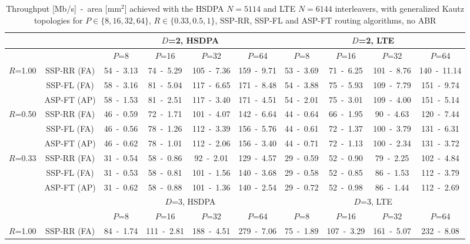 \documentclass[10pt,twocolumn,journal]{IEEEtran}
\begin{document}
\begin{table*}[t!]
  \centering
  \caption{Throughput [Mb/s]~-~area [mm$^2$] achieved with the HSDPA $N=5114$ and LTE $N=6144$ interleavers, 
with generalized Kautz topologies for $P \in \{8, 16, 32, 64\}$, $R \in \{0.33, 0.5, 1\}$, SSP-RR, SSP-FL and ASP-FT routing algorithms, no ABR} 
  \label{tab:hsdpa_lte}
   { \scriptsize
  \begin{tabular}{|c|c|c|c|c|c|c|c|c|c|}
\hline
& 	 & \multicolumn{4}{c|}{$D$=2, HSDPA} & \multicolumn{4}{c|}{$D$=2, LTE} \\
\hline
& 	 & $P$=8 & $P$=16 & $P$=32 & $P$=64  & $P$=8 & $P$=16 & $P$=32 & $P$=64 \\
\hline
\multirow{3}{*}{$R$=1.00} & SSP-RR (FA) & 54~-~3.13 & 74~-~5.29 & 105~-~7.36 & 159~-~9.71 
& 53~-~3.69 & 71~-~6.25 & 101~-~8.76 & 140~-~11.14 \\
& SSP-FL (FA) & 58~-~3.16 & 81~-~5.04 & 117~-~6.65 & 171~-~8.48 
& 54~-~3.88 & 75~-~5.93 & 109~-~7.79 & 151~-~9.74 \\
& ASP-FT (AP) & 58~-~1.53 & 81~-~2.51 & 117~-~3.40 & 171~-~4.51 
& 54~-~2.01 & 75~-~3.01 & 109~-~4.00 & 151~-~5.14 \\
\hline
\multirow{3}{*}{$R$=0.50} & SSP-RR (FA) & 46~-~0.59 & 72~-~1.71 & 101~-~4.07 & 142~-~6.64 
& 44~-~0.64 & 66~-~1.95 & 90~-~4.63 & 120~-~7.44 \\
& SSP-FL (FA) & 46~-~0.56 & 78~-~1.26 & 112~-~3.39 & 156~-~5.76 
& 44~-~0.61 & 72~-~1.37 & 100~-~3.79 & 131~-~6.31 \\
& ASP-FT (AP) \cite{martina_MPMS11} & 46~-~0.62 & 78~-~1.01 & 112~-~2.06 & 156~-~3.40 
& 44~-~0.71 & 72~-~1.13 & 100~-~2.34 & 131~-~3.72 \\
\hline
\multirow{3}{*}{$R$=0.33} & SSP-RR (FA) & 31~-~0.54 & 58~-~0.86 & 92~-~2.01 & 129~-~4.57 
& 29~-~0.59 & 52~-~0.90 & 79~-~2.25 & 102~-~4.84 \\
& SSP-FL (FA) & 31~-~0.53 & 58~-~0.81 & 101~-~1.56 & 140~-~3.68 
& 29~-~0.58 & 52~-~0.85 & 86~-~1.53 & 112~-~3.79 \\
& ASP-FT (AP) & 31~-~0.62 & 58~-~0.88 & 101~-~1.36 & 140~-~2.54 
& 29~-~0.72 & 52~-~0.98 & 86~-~1.44 & 112~-~2.69 \\
\hline
\hline
& 	 & \multicolumn{4}{c|}{$D$=3, HSDPA} & \multicolumn{4}{c|}{$D$=3, LTE} \\
\hline
& 	 & $P$=8 & $P$=16 & $P$=32 & $P$=64  & $P$=8 & $P$=16 & $P$=32 & $P$=64 \\
\hline
\multirow{3}{*}{$R$=1.00} & SSP-RR (FA) & 84~-~1.74 & 111~-~2.81 & 188~-~4.51 & 279~-~7.06 
& 75~-~1.89 & 107~-~3.29 & 161~-~5.07 & 232~-~8.08 \\

\end{tabular}}
\end{table*}
\end{document}
